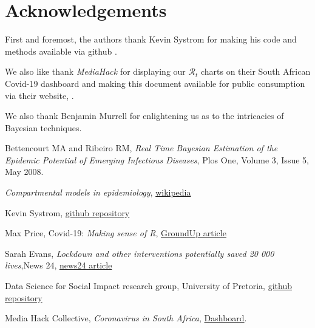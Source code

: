 \documentclass[11pt]{article}
\begin{document}
\section{Acknowledgements}

First and foremost, the authors thank Kevin Systrom for making his code and methods
available via github \cite{systrom}.

We also like thank {\it MediaHack} for displaying our $\mathcal{R}_t$ charts
on their South African Covid-19 dashboard and making this document available for 
public consumption via their website, \cite{mediahack}.

We also thank Benjamin Murrell for enlightening us as to the intricacies of Bayesian techniques.

\begin{thebibliography}{99}

Bettencourt MA and Ribeiro RM, {\em Real Time Bayesian Estimation of the Epidemic Potential of Emerging Infectious Diseases}, Plos One, Volume 3, Issue 5, May 2008.

 {\em Compartmental models in epidemiology},
\href{http://en.wikipedia.org/wiki/Compartmental_models_in_epidemiology}{wikipedia}

 Kevin Systrom, 
\href{https://github.com/k-sys/covid-19/blob/master/Realtime%20Rt%20mcmc.ipynb}{github repository}

 Max Price, Covid-19: {\em Making sense of R}, 
\href{https://www.groundup.org.za/article/covid-19-making-sense-of-r}{GroundUp article}

 Sarah Evans, {\em Lockdown and other interventions potentially saved 20 000 lives},News 24, \href{https://www.news24.com/SouthAfrica/News/lockdown-and-other-interventions-potentially-saved-20-000-lives-top-scientist-20200513}{news24 article}

 Data Science for Social Impact research group, University of Pretoria, \href{https://raw.githubusercontent.com/dsfsi/covid19za/master/data/covid19za_provincial_cumulative_timeline_confirmed.csv} {github repository}
 
Media Hack Collective, {\em Coronavirus in South Africa},
\href{https://mediahack.co.za/datastories/coronavirus/dashboard/}{Dashboard}.

\end{thebibliography}
\end{document}
